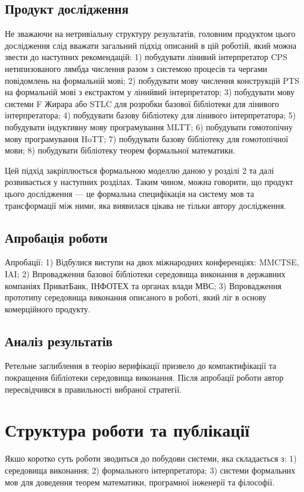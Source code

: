 \subsection{Продукт дослідження}
Не зважаючи на нетривіальну структуру результатів, головним продуктом цього
дослідження слід вважати загальний підхід описаний в цій роботій, який можна
звести до наступних рекомендацій:
1) побудувати лінивий інтерпретатор CPS нетипизованого лямбда числення разом
   з системою процесів та чергами повідомлень на формальній мові;
2) побудувати мову числення конструкцій PTS на формальній мові з екстрактом у лінийвий інтерпретатор;
3) побудувати мову системи F Жирара або STLC для розробки базової бібліотеки для лінивого інтерпретатора;
4) побудувати базову бібліотеку для лінивого інтерпретатора;
5) побудувати індуктивну мову програмування MLTT;
6) побудувати гомотопічну мову програмування HoTT;
7) побудувати базову бібліотеку для гомотопічної мови;
8) побудувати бібліотеку теорем формальної математики.

Цей підхід закріплюється формальною моделлю даною у розділі 2 та далі розвивається у наступних розділах.
Таким чином, можна говорити, що продукт цього дослідження --- це формальна специфікація на систему мов та
трансформації між ними, яка виявилася цікава не тільки автору дослідження.

\subsection{Апробація роботи}
Апробації:
1) Відбулися виступи на двох міжнародних конференціях: MMCTSE, IAI;
2) Впровадження базової бібліотеки середовища виконання в державних компаніях ПриватБанк,
   ІНФОТЕХ та органах влади МВС;
3) Впровадження прототипу середовища виконання описаного в роботі,
   який ліг в основу комерційного продукту.

\subsection{Аналіз результатів}
Ретельне заглиблення в теорію верифікації призвело до компактифікації
та покращення бібліотеки середовища виконання. Після апробації роботи
автор пересвідчився в правильності вибраної стратегії.

\newpage
\section{Структура роботи та публікації}
Якшо коротко суть роботи зводиться до побудови системи, яка складається з:
1) середовища виконання;
2) формального інтерпретатора;
3) системи формальних мов для доведення теорем математики, програмної інженерії та філософії.

